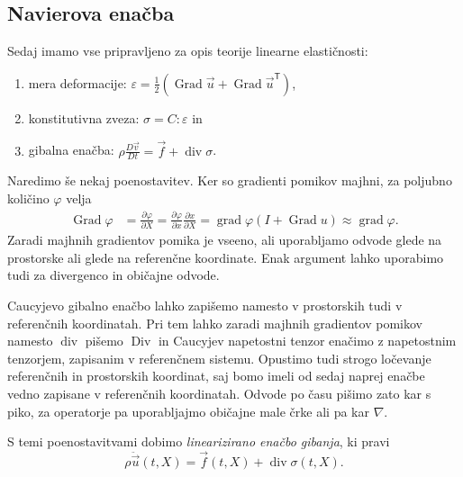 \documentclass[12pt,a4paper,twoside]{article}
\theoremstyle{definition} %
\theoremstyle{plain} %
\numberwithin{equation}{section}
\newcommand{\T}{\mathsf{T}}
\renewcommand{\div}{\operatorname{div}}
\newcommand{\grad}{\operatorname{grad}}
\newcommand{\Div}{\operatorname{Div}}
\newcommand{\Grad}{\operatorname{Grad}}
\renewcommand{\phi}{\varphi}
\newcommand{\eps}{\varepsilon}
\newcommand{\dpar}[2]{\ensuremath{\frac{\partial #1}{\partial #2}}}
\newcommand{\DD}[2]{\ensuremath{\frac{D #1}{D #2}}}
\newcommand{\DDt}[1]{\DD{#1}{t}}
\newcommand{\vv}{\vec{v}}
\newcommand{\vu}{\vec{u}}
\newcommand{\vf}{\vec{f}}
\newcommand{\vX}{X}
\newcommand{\vx}{x}
\newcommand{\ts}{\sigma}
\begin{document}
\subsection{Navierova enačba}
Sedaj imamo vse pripravljeno za opis teorije linearne elastičnosti:
\begin{enumerate}[\indent 1)]
  \item mera deformacije: $\eps = \frac12(\Grad \vu + \Grad \vu^\T)$,
  \item konstitutivna zveza: $\ts = C : \eps$ in
  \item gibalna enačba: $\rho \DDt{\vv} = \vf + \div \ts$.
\end{enumerate}

Naredimo še nekaj poenostavitev. Ker so gradienti pomikov majhni,
za poljubno količino $\phi$ velja
\begin{align*}
  \Grad\phi &= \dpar{\phi}{\vX} = \dpar{\phi}{\vx} \dpar{\vx}{\vX} = \grad\phi
  (I + \Grad u) \approx \grad \phi.
\end{align*}
Zaradi majhnih gradientov pomika je vseeno, ali uporabljamo odvode glede na
prostorske ali glede na referenčne koordinate. Enak argument lahko uporabimo
tudi za divergenco in običajne odvode.

Caucyjevo gibalno enačbo lahko zapišemo namesto v prostorskih tudi v referenčnih
koordinatah. Pri tem lahko zaradi majhnih gradientov pomikov namesto $\div$
pišemo $\Div$ in Caucyjev napetostni tenzor enačimo z napetostnim tenzorjem,
zapisanim v referenčnem sistemu. Opustimo tudi strogo ločevanje referenčnih in
prostorskih koordinat, saj bomo imeli od sedaj naprej enačbe vedno zapisane v
referenčnih koordinatah. Odvode po času pišimo zato kar s piko, za operatorje pa
uporabljajmo običajne male črke ali pa kar $\nabla$.

S temi poenostavitvami dobimo \emph{linearizirano enačbo gibanja}, ki pravi
\begin{equation}
  \rho \ddot{\vu}(t, \vX) = \vf(t, \vX) + \div\sigma(t, \vX).
  \label{eq:gib-lin}
\end{equation}
\end{document}
